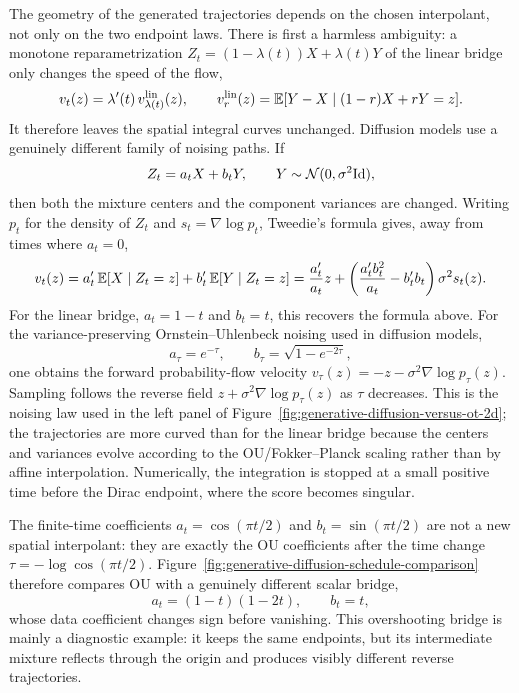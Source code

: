 The geometry of the generated trajectories depends on the chosen interpolant, not only on the two endpoint laws. There is first a harmless ambiguity: a monotone reparametrization $Z_t=(1-\lambda(t))X+\lambda(t)Y$ of the linear bridge only changes the speed of the flow,
\[
	v_t(z)=\lambda'(t)\,v^{\rm lin}_{\lambda(t)}(z),
	\qquad
	v^{\rm lin}_{r}(z)=\mathbb{E}[Y-X\mid (1-r)X+rY=z].
\]
It therefore leaves the spatial integral curves unchanged. Diffusion models use a genuinely different family of noising paths. If
\[
	Z_t=a_tX+b_tY,\qquad Y\sim\mathcal{N}(0,\sigma^2\mathrm{Id}),
\]
then both the mixture centers and the component variances are changed. Writing $p_t$ for the density of $Z_t$ and $s_t=\nabla\log p_t$, Tweedie's formula gives, away from times where $a_t=0$,
\[
	v_t(z)=a'_t\,\mathbb{E}[X\mid Z_t=z]+b'_t\,\mathbb{E}[Y\mid Z_t=z]
	=\frac{a'_t}{a_t}z+
	\left(\frac{a'_tb_t^2}{a_t}-b'_tb_t\right)\sigma^2s_t(z).
\]
For the linear bridge, $a_t=1-t$ and $b_t=t$, this recovers the formula above. For the variance-preserving Ornstein--Uhlenbeck noising used in diffusion models,
\[
	a_\tau=e^{-\tau},\qquad b_\tau=\sqrt{1-e^{-2\tau}},
\]
one obtains the forward probability-flow velocity $v_\tau(z)=-z-\sigma^2\nabla\log p_\tau(z)$. Sampling follows the reverse field $z+\sigma^2\nabla\log p_\tau(z)$ as $\tau$ decreases. This is the noising law used in the left panel of Figure~\ref{fig:generative-diffusion-versus-ot-2d}; the trajectories are more curved than for the linear bridge because the centers and variances evolve according to the OU/Fokker--Planck scaling rather than by affine interpolation. Numerically, the integration is stopped at a small positive time before the Dirac endpoint, where the score becomes singular.

The finite-time coefficients $a_t=\cos(\pi t/2)$ and $b_t=\sin(\pi t/2)$ are not a new spatial interpolant: they are exactly the OU coefficients after the time change $\tau=-\log\cos(\pi t/2)$. Figure~\ref{fig:generative-diffusion-schedule-comparison} therefore compares OU with a genuinely different scalar bridge,
\[
	a_t=(1-t)(1-2t),
	\qquad
	b_t=t,
\]
whose data coefficient changes sign before vanishing. This overshooting bridge is mainly a diagnostic example: it keeps the same endpoints, but its intermediate mixture reflects through the origin and produces visibly different reverse trajectories.

